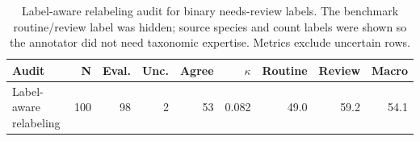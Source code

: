 \begin{table}[h]
\centering
\caption{Label-aware relabeling audit for binary needs-review labels. The benchmark routine/review label was hidden; source species and count labels were shown so the annotator did not need taxonomic expertise. Metrics exclude uncertain rows.}
\label{tab:needs-review-plausibility-audit}
\scriptsize
\setlength{\tabcolsep}{3pt}
\begin{tabular}{lrrrrrrrr}
\toprule
Audit & N & Eval. & Unc. & Agree & $\kappa$ & Routine & Review & Macro \\
\midrule
Label-aware relabeling & 100 & 98 & 2 & 53 & 0.082 & 49.0 & 59.2 & 54.1 \\
\bottomrule
\end{tabular}
\end{table}

